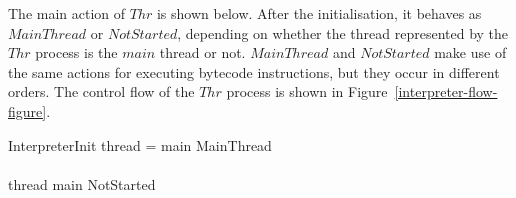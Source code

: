 The main action of $Thr$ is shown below. 
After the initialisation, it behaves as $MainThread$ or $NotStarted$,
depending on whether the thread represented by the $Thr$ process is
the $main$ thread or not.
$MainThread$ and $NotStarted$ make use of the same actions for
executing bytecode instructions, but they occur in different orders.
The control flow of the $Thr$ process is shown in
Figure~\ref{interpreter-flow-figure}.
\begin{circusaction}
  \circspot \lschexpract InterpreterInit \rschexpract \circseq {}
  \circblockbegin
    \lcircguard thread = main \rcircguard \circguard MainThread \\
    {} \extchoice {} \\
    \lcircguard thread \neq main \rcircguard \circguard NotStarted
  \circblockend
\end{circusaction}

